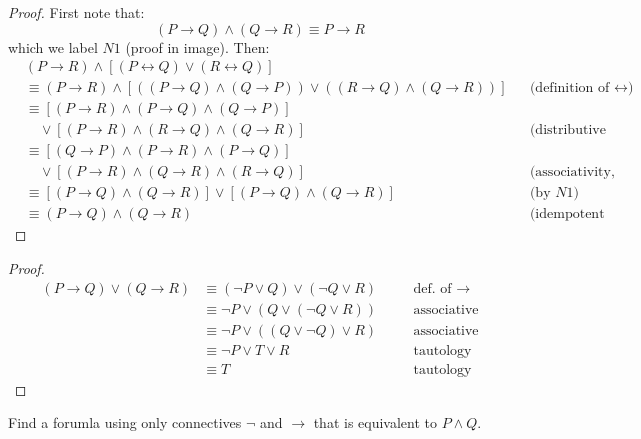 \begin{proof}
First note that:
\[
(P \rightarrow Q) \wedge (Q \rightarrow R) \equiv P \rightarrow R
\]
which we label $N1$ (proof in image). Then:
\begin{align*}
& (P \rightarrow R) \wedge [(P \leftrightarrow Q) \vee (R \leftrightarrow Q)] \\
& \equiv (P \rightarrow R) \wedge 
\left[((P \rightarrow Q) \wedge (Q \rightarrow P)) 
\vee ((R \rightarrow Q) \wedge (Q \rightarrow R))\right] 
&& \text{(definition of $\leftrightarrow$)} \\
& \equiv \left[(P \rightarrow R) \wedge (P \rightarrow Q) \wedge (Q \rightarrow P)\right] \\
& \quad \vee \left[(P \rightarrow R) \wedge (R \rightarrow Q) \wedge (Q \rightarrow R)\right]
&& \text{(distributive law)} \\
& \equiv \left[(Q \rightarrow P) \wedge (P \rightarrow R) \wedge (P \rightarrow Q)\right] \\
& \quad \vee \left[(P \rightarrow R) \wedge (Q \rightarrow R) \wedge (R \rightarrow Q)\right]
&& \text{(associativity, commutativity)} \\
& \equiv \left[(P \rightarrow Q) \wedge (Q \rightarrow R)\right] 
\vee \left[(P \rightarrow Q) \wedge (Q \rightarrow R)\right]
&& \text{(by $N1$)} \\
& \equiv (P \rightarrow Q) \wedge (Q \rightarrow R)
&& \text{(idempotent law)}
\end{align*}
\end{proof}

\begin{proof}
\begin{align*}
(P \rightarrow Q) \vee (Q \rightarrow R) &\equiv (\neg P \vee Q) \vee (\neg Q \vee R) && \quad \text{def. of $\rightarrow$} \\
&\equiv \neg P \vee (Q \vee (\neg Q \vee R)) && \quad \text{associative} \\
&\equiv \neg P \vee ((Q \vee \neg Q) \vee R) && \quad \text{associative} \\
&\equiv \neg P \vee T \vee R && \quad \text{tautology} \\
&\equiv T && \quad \text{tautology}
\end{align*}
\end{proof}

\begin{tcolorbox}[title=Problem 9, breakable]
Find a forumla using only connectives $\neg$ and $\rightarrow$ that is equivalent to 
$P \wedge Q$.
\end{tcolorbox}

